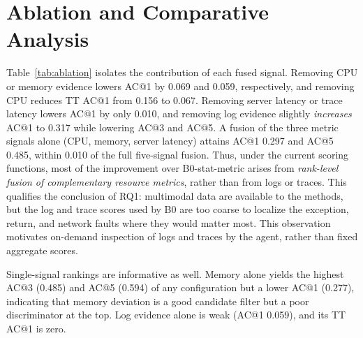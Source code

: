 \documentclass[conference]{IEEEtran}
\begin{document}
\section{Ablation and Comparative Analysis}\label{sec:ablation}

Table~\ref{tab:ablation} isolates the contribution of each fused signal. Removing CPU or memory evidence lowers AC@1 by 0.069 and 0.059, respectively, and removing CPU reduces TT AC@1 from 0.156 to 0.067. Removing server latency or trace latency lowers AC@1 by only 0.010, and removing log evidence slightly \emph{increases} AC@1 to 0.317 while lowering AC@3 and AC@5. A fusion of the three metric signals alone (CPU, memory, server latency) attains AC@1 0.297 and AC@5 0.485, within 0.010 of the full five-signal fusion. Thus, under the current scoring functions, most of the improvement over B0-stat-metric arises from \emph{rank-level fusion of complementary resource metrics}, rather than from logs or traces. This qualifies the conclusion of RQ1: multimodal data are available to the methods, but the log and trace scores used by B0 are too coarse to localize the exception, return, and network faults where they would matter most. This observation motivates on-demand inspection of logs and traces by the agent, rather than fixed aggregate scores.

Single-signal rankings are informative as well. Memory alone yields the highest AC@3 (0.485) and AC@5 (0.594) of any configuration but a lower AC@1 (0.277), indicating that memory deviation is a good candidate filter but a poor discriminator at the top. Log evidence alone is weak (AC@1 0.059), and its TT AC@1 is zero.
\end{document}
